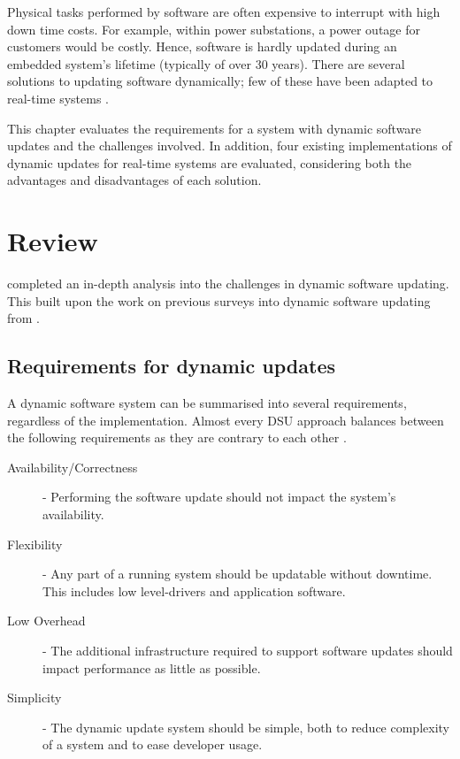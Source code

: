 Physical tasks performed by software are often expensive to interrupt with high down time costs. For example, within power substations, a power outage for customers would be costly. Hence, software is hardly updated during an embedded system's lifetime (typically of over 30 years). There are several solutions to updating software dynamically; few of these have been adapted to real-time systems \autocite{wahlerDynamicSoftwareUpdates2009}.

This chapter evaluates the requirements for a system with dynamic software updates and the challenges involved. In addition, four existing implementations of dynamic updates for real-time systems are evaluated, considering both the advantages and disadvantages of each solution.

\clearpage

\section{Review}

\textcite{mlinaricChallengesDynamicSoftware2020} completed an in-depth analysis into the challenges in dynamic software updating. This built upon the work on previous surveys into dynamic software updating from \textcite{seifzadehSurveyDynamicSoftware2013}.



\subsection{Requirements for dynamic updates}
A dynamic software system can be summarised into several requirements, regardless of the implementation. Almost every DSU approach balances between the following requirements as they are contrary to each other \autocite{mlinaricChallengesDynamicSoftware2020}.

\begin{description}
    \item [Availability/Correctness] - Performing the software update should not impact the system's availability.
    \item [Flexibility] - Any part of a running system should be updatable without downtime. This includes low level-drivers and application software.
    \item [Low Overhead]- The additional infrastructure required to support software updates should impact performance as little as possible.
    \item [Simplicity] - The dynamic update system should be simple, both to reduce complexity of a system and to ease developer usage.
\end{description}

